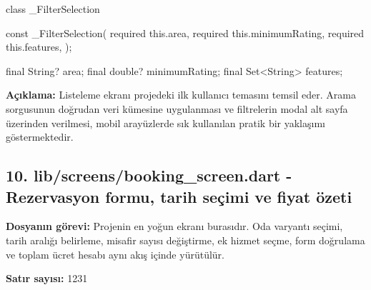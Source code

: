 \documentclass[11pt,a4paper]{article}
\begin{document}
\begin{codeblock}
class _FilterSelection {
  const _FilterSelection({
    required this.area,
    required this.minimumRating,
    required this.features,
  });

  final String? area;
  final double? minimumRating;
  final Set<String> features;
}
\end{codeblock}

\textbf{Açıklama:} Listeleme ekranı projedeki ilk kullanıcı temasını temsil eder. Arama sorgusunun doğrudan veri kümesine uygulanması ve filtrelerin modal alt sayfa üzerinden verilmesi, mobil arayüzlerde sık kullanılan pratik bir yaklaşımı göstermektedir.

\clearpage
\subsection{10. lib/screens/booking\_screen.dart - Rezervasyon formu, tarih seçimi ve fiyat özeti}
\textbf{Dosyanın görevi:} Projenin en yoğun ekranı burasıdır. Oda varyantı seçimi, tarih aralığı belirleme, misafir sayısı değiştirme, ek hizmet seçme, form doğrulama ve toplam ücret hesabı aynı akış içinde yürütülür.

\textbf{Satır sayısı:} 1231
\end{document}
